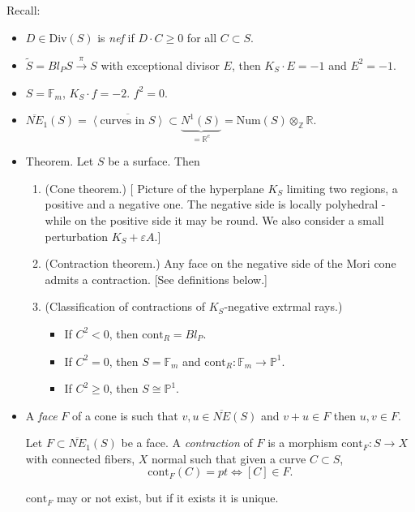 \medskip\noindent
Recall:
\begin{itemize}
\item $D \in \text{Div}(S)$ is {\it nef} if
$D\cdot C \geq 0$ for all $C \subset S$.

\item [Take the blow up of a surface at a
point:]
$\tilde{S}=Bl_PS \xrightarrow{\pi}S$ with
exceptional divisor $E$,
then $K_S\cdot E=-1$ and $E^2=-1$.

\item $S= \mathbb{F}_m$, $K_S\cdot f=-2$.
$f^2=0$.

\item{}
$\overline{NE}_1(S)=
\overline{\left\langle{}\text{curves
in $S$}\right\rangle{}}
\subset \underbrace{N^1(S)}_{=\mathbb{R}^e}
=\text{Num}(S) \otimes_\mathbb{Z}
\mathbb{R}$.

\item Theorem. Let $S$ be a surface. Then
\begin{enumerate}
\item (Cone theorem.) [
Picture of the hyperplane $K_S$ limiting two
regions,
a positive and a negative one. The negative
side is locally
polyhedral - while on the positive
side it may be round. We also consider a
small
perturbation $K_S+\varepsilon A$.]

\item (Contraction theorem.)
Any face on the negative side of the Mori
cone admits a contraction.
[See definitions below.]

\item (Classification of contractions
of $K_S$-negative extrmal rays.)
\begin{itemize}
\item If $C^2<0$, then  $\text{cont}_R=Bl_P$.
\item If $C^2=0$, then  $S= \mathbb{F}_m$
and $\text{cont}_R:\mathbb{F}_m \to
\mathbb{P}^1$.
\item If $C^2 \geq 0$,
then $S \cong \mathbb{P}^1$.
\end{itemize}
\end{enumerate}

\item {}
A {\it face} $F$ of a cone is such that  $v,u
\in \overline{ NE}(S)$
and $v+u \in F$ then $u,v \in F$.

\begin{definition}
\label{definition-contraction-of-face}
Let $F \subset \overline{NE}_1(S)$ be a face.
A {\it contraction} of $F$ is a morphism
$\text{cont}_F:S \to X$
with connected fibers,
$X$ normal such that
given a curve $C \subset S$,
$$
\text{cont}_F(C) = pt \iff
[C] \in F.
$$
\end{definition}

\begin{remark}
\label{remark-contractions}
$\text{cont}_F$ may or not exist, but if it
exists it is unique.
\end{remark}
\end{itemize}

